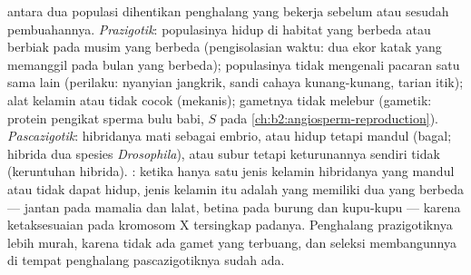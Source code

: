\begin{proposition}\label{prop:b2:speciation:isolation}
%
 antara dua populasi dihentikan penghalang yang bekerja
sebelum atau sesudah pembuahannya. \emph{Prazigotik}: populasinya hidup
di habitat yang berbeda atau berbiak pada musim yang berbeda
(pengisolasian waktu: dua ekor katak yang memanggil pada bulan yang
berbeda); populasinya tidak mengenali pacaran satu sama lain (perilaku:
nyanyian jangkrik, sandi cahaya kunang-kunang, tarian itik); alat
kelamin atau  tidak cocok (mekanis); gametnya tidak melebur
(gametik: protein pengikat sperma bulu babi,  $S$ pada
\cref{ch:b2:angiosperm-reproduction}). \emph{Pascazigotik}: hibridanya
mati sebagai embrio, atau hidup tetapi mandul (bagal; hibrida dua
spesies \emph{Drosophila}), atau subur tetapi keturunannya sendiri
tidak (keruntuhan hibrida). \emph{}: ketika hanya satu
jenis kelamin hibridanya yang mandul atau tidak dapat hidup, jenis
kelamin itu adalah yang memiliki dua  yang berbeda ---
jantan pada mamalia dan lalat, betina pada burung dan kupu-kupu ---
karena ketaksesuaian  pada kromosom X tersingkap padanya.
Penghalang prazigotiknya lebih murah, karena tidak ada gamet yang
terbuang, dan seleksi membangunnya di tempat penghalang pascazigotiknya
sudah ada.
\end{proposition}

